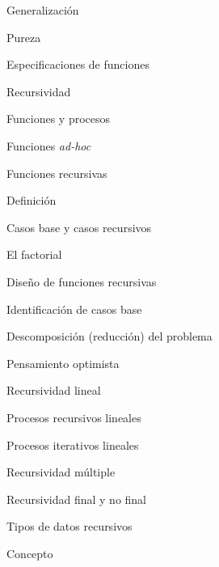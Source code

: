 \begin{longenum}
\begin{longenum}
\begin{longenum}
\begin{longenum}
                \item Generalización
            \end{longenum}
            \item Pureza
            \item Especificaciones de funciones
        \end{longenum}
        \item Recursividad \opcional\
        \begin{longenum}
            \item Funciones y procesos
            \begin{longenum}
                \item Funciones \textit{ad-hoc}
            \end{longenum}
            \item Funciones recursivas
            \begin{longenum}
                \item Definición
                \item Casos base y casos recursivos
                \item El factorial
                \item Diseño de funciones recursivas
                \begin{longenum}
                    \item Identificación de casos base
                    \item Descomposición (reducción) del problema
                    \item Pensamiento optimista
                \end{longenum}
                \item Recursividad lineal
                \begin{longenum}
                    \item Procesos recursivos lineales \opcional\
                    \item Procesos iterativos lineales \opcional\
                \end{longenum}
                \item Recursividad múltiple
                \item Recursividad final y no final \opcional\
            \end{longenum}
            \item Tipos de datos recursivos
            \begin{longenum}
                \item Concepto

\end{longenum}
\end{longenum}
\end{longenum}
\end{longenum}
